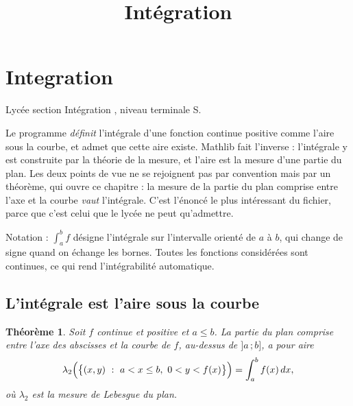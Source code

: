 \documentclass[11pt,a4paper]{article}
\title{Intégration}
\date{}
\theoremstyle{definition}
\theoremstyle{plain}
\newtheorem{theoreme}{Théorème}
\begin{document}
\maketitle
\sloppy

\section{Integration}

\noindent
Lycée \textemdash{} section \og{} Intégration \fg{}, niveau terminale S.

\medskip\noindent
Le programme \emph{définit} l'intégrale d'une fonction continue positive comme l'aire
sous la courbe, et admet que cette aire existe. Mathlib fait l'inverse : l'intégrale y est
construite par la théorie de la mesure, et l'aire est la mesure d'une partie du plan. Les
deux points de vue ne se rejoignent pas par convention mais par un théorème, qui ouvre ce
chapitre : la mesure de la partie du plan comprise entre l'axe et la courbe \emph{vaut}
l'intégrale. C'est l'énoncé le plus intéressant du fichier, parce que c'est celui que le
lycée ne peut qu'admettre.

\medskip\noindent
Notation : $\int_a^b f$ désigne l'intégrale sur l'intervalle orienté de $a$ à $b$, qui
change de signe quand on échange les bornes. Toutes les fonctions considérées sont
continues, ce qui rend l'intégrabilité automatique.

\subsection{L'intégrale est l'aire sous la courbe}

\begin{theoreme}
Soit $f$ continue et positive et $a \le b$. La partie du plan comprise entre l'axe des
abscisses et la courbe de $f$, au-dessus de $]a\,;b]$, a pour aire
\[ \lambda_2\Bigl(\bigl\{(x, y) \ :\ a < x \le b,\ 0 < y < f(x)\bigr\}\Bigr)
   = \int_a^b f(x)\,dx , \]
où $\lambda_2$ est la mesure de Lebesgue du plan.
\end{theoreme}
\end{document}
